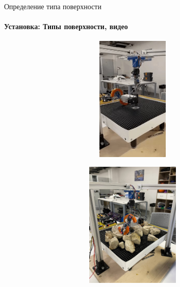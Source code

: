 \documentclass[aspectratio=169,xcolor=table]{beamer}
\begin{document}
\begin{frame}[t]{Определение типа поверхности}
    \framesubtitle{Установка: Типы поверхности, видео}
    \vspace{-15pt}
    \begin{figure}[H]
        \begin{subfigure}{0.49\textwidth}
            \href{https://gifyu.com/image/SxatY}
            {\centering\includegraphics[height=6cm,width=1\textwidth,keepaspectratio]{s_shape_leg/flat.jpg}}
        \end{subfigure}
        \hfill
        \begin{subfigure}{0.49\textwidth}
            \href{https://gifyu.com/image/Sxatt}
            {\centering\includegraphics[height=6cm,width=1\textwidth,keepaspectratio]{s_shape_leg/view.jpg}}
        \end{subfigure}
    \end{figure}
\end{frame}

\end{document}
